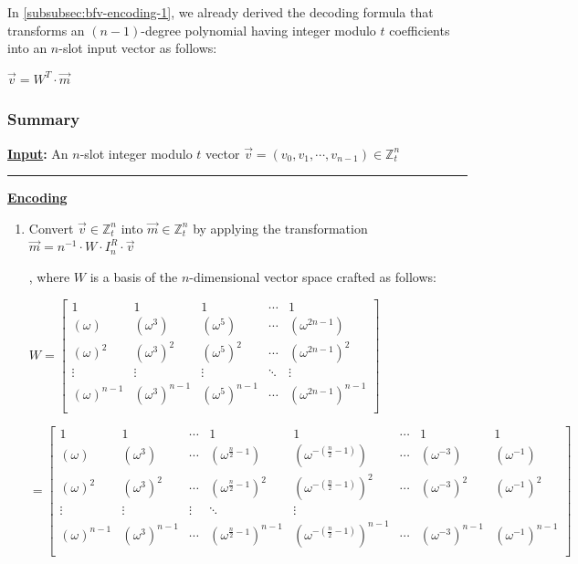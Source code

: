 In \autoref{subsubsec:bfv-encoding-1}, we already derived the decoding formula that transforms an $(n-1)$-degree polynomial having integer modulo $t$ coefficients into an $n$-slot input vector as follows: 

$\vec{v} = W^T \cdot \vec{m}$


\subsubsection{Summary}
\label{subsubsec:bfv-encoding-summary}

\begin{tcolorbox}[title={\textbf{\tboxlabel{\ref*{subsubsec:bfv-encoding-summary}} BFV's Encoding and Decoding}}]



\textbf{\underline{Input}:} An $n$-slot integer modulo $t$ vector $\vec{v} = (v_0, v_1, \cdots, v_{n-1}) \in \mathbb{Z}_t^n$

\par\noindent\rule{\textwidth}{0.4pt}

\textbf{\underline{Encoding}} 
\begin{enumerate}

\item Convert $\vec{v} \in \mathbb{Z}_t^n$ into $\vec{m} \in \mathbb{Z}_t^n$ by applying the transformation $\vec{m} = n^{-1}\cdot W \cdot I_n^R \cdot \vec{v}$

, where $W$ is a basis of the $n$-dimensional vector space crafted as follows: 

$W =  \begin{bmatrix}
1 & 1 & 1 & \cdots & 1\\
(\omega) & (\omega^3) & (\omega^5) & \cdots & (\omega^{2n-1})\\
(\omega)^2 & (\omega^3)^2 & (\omega^5)^2 & \cdots & (\omega^{2n-1})^2\\
\vdots & \vdots & \vdots & \ddots & \vdots \\
(\omega)^{n-1} & (\omega^3)^{n-1} & (\omega^5)^{n-1} & \cdots & (\omega^{2n-1})^{n-1}\\
\end{bmatrix}$

$= \begin{bmatrix}
1 & 1 & \cdots & 1 & 1 & \cdots & 1 & 1\\
(\omega) & (\omega^3) & \cdots & (\omega^{\frac{n}{2} - 1}) & (\omega^{-(\frac{n}{2} - 1)}) & \cdots & (\omega^{-3}) & (\omega^{-1})\\
(\omega)^2 & (\omega^3)^2 & \cdots & (\omega^{\frac{n}{2} - 1})^2 & (\omega^{-(\frac{n}{2} - 1)})^2 & \cdots & (\omega^{-3})^2 & (\omega^{-1})^2\\
\vdots & \vdots & \vdots & \ddots & \vdots \\
(\omega)^{n-1} & (\omega^3)^{n-1} & \cdots & (\omega^{\frac{n}{2} - 1})^{n-1} & (\omega^{-(\frac{n}{2} - 1)})^{n-1} & \cdots & (\omega^{-3})^{n-1} & (\omega^{-1})^{n-1}\\
\end{bmatrix}$


\end{enumerate}
\end{tcolorbox}
